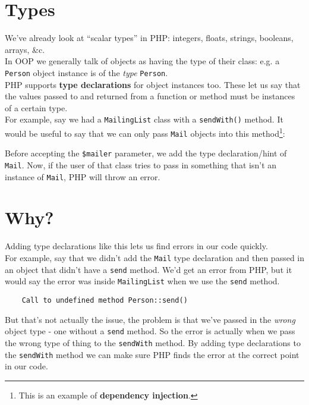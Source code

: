 \section{Types}

We've already look at ``scalar types'' in PHP: integers, floats, strings, booleans, arrays, \&c.
\\

In OOP we generally talk of objects as having the type of their class: e.g. a \texttt{Person} object instance is of the \textit{type} \texttt{Person}.
\\

PHP supports \textbf{type declarations} for object instances too. These let us say that the values passed to and returned from a function or method must be instances of a certain type.
\\

For example, say we had a \texttt{MailingList} class with a \texttt{sendWith()} method. It would be useful to say that we can only pass \texttt{Mail} objects into this method\footnote{This is an example of \textbf{dependency injection}.}:


Before accepting the \texttt{\$mailer} parameter, we add the type declaration/hint of \texttt{Mail}. Now, if the user of that class tries to pass in something that isn't an instance of \texttt{Mail}, PHP will throw an error.



\section{Why?}

Adding type declarations like this lets us find errors in our code quickly.
\\

For example, say that we didn't add the \texttt{Mail} type declaration and then passed in an object that didn't have a \texttt{send} method. We'd get an error from PHP, but it would say the error was inside \texttt{MailingList} when we use the \texttt{send} method.

\begin{verbatim}
    Call to undefined method Person::send()
\end{verbatim}

But that's not actually the issue, the problem is that we've passed in the \textit{wrong} object type - one without a \texttt{send} method. So the error is actually when we pass the wrong type of thing to the \texttt{sendWith} method. By adding type declarations to the \texttt{sendWith} method we can make sure PHP finds the error at the correct point in our code.

